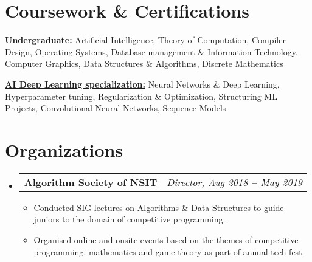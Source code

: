 \documentclass[letterpaper,11pt]{article}
\makeatletter
\newcommand{\resumeItem}[1]{
  \item\small{
    {#1 \vspace{-2pt}}
  }
}
\newcommand{\resumeOrganizationHeading}[2]{
  \vspace{-2pt}\item
    \begin{tabular*}{0.97\textwidth}[t]{l@{\extracolsep{\fill}}r}
      \textbf{#1} & \textit{\small #2} \\
    \end{tabular*}\vspace{-7pt}
}
\newcommand{\resumeSubHeadingListStart}{\begin{itemize}[leftmargin=0.15in, label={}]}
\newcommand{\resumeSubHeadingListEnd}{\end{itemize}}
\newcommand{\resumeItemListStart}{\begin{itemize}}
\newcommand{\resumeItemListEnd}{\end{itemize}\vspace{-5pt}}
\makeatother
\begin{document}

\section{Coursework \& Certifications}
\vspace{2pt}
\resumeSubHeadingListStart
\small{\item{
	\textbf{Undergraduate:}{ Artificial Intelligence, Theory of Computation, Compiler Design, Operating Systems, Database management \& Information Technology, Computer Graphics, Data Structures \& Algorithms, Discrete Mathematics} 
	\\ \vspace{3pt}
	        
	\href{https://www.coursera.org/account/accomplishments/specialization/3435R2T22BF5}{\textbf{AI Deep Learning specialization:}}{ Neural Networks \& Deep Learning, Hyperparameter tuning, Regularization \& Optimization, Structuring ML Projects, Convolutional Neural Networks, Sequence Models}
}}
\resumeSubHeadingListEnd



\section{Organizations}
\resumeSubHeadingListStart
    
\resumeOrganizationHeading
{\href{https://www.facebook.com/AlgorithmSocietyOfNSIT/}{Algorithm Society of NSIT}}
{Director, Aug 2018 \textbf{--} May 2019}
\resumeItemListStart
\resumeItem{Conducted SIG lectures on Algorithms \& Data Structures to guide juniors to the domain of competitive programming.}
\resumeItem{Organised online and onsite events based on the themes of competitive programming, mathematics and game theory as part of annual tech fest.}
\resumeItemListEnd
    
\resumeSubHeadingListEnd


\end{document}

